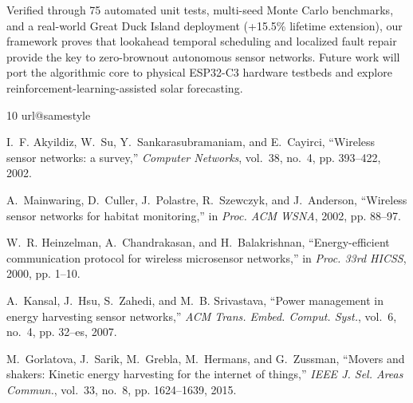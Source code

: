 \documentclass[journal]{IEEEtran}
\begin{document}
Verified through 75 automated unit tests, multi-seed Monte Carlo benchmarks, and a real-world Great Duck Island deployment (+15.5\% lifetime extension), our framework proves that lookahead temporal scheduling and localized fault repair provide the key to zero-brownout autonomous sensor networks. Future work will port the algorithmic core to physical ESP32-C3 hardware testbeds and explore reinforcement-learning-assisted solar forecasting.


\begin{thebibliography}{10}
\providecommand{\url}[1]{#1}
\csname url@samestyle\endcsname
\providecommand{\newblock}{\relax}
\providecommand{\bibinfo}[2]{#2}
\providecommand{\BIBentrySTDinterwordspacing}{\spaceskip=0pt\relax}
\providecommand{\BIBentryALTinterwordstretchfactor}{4}
\providecommand{\BIBentryALTinterwordspacing}{\spaceskip=\fontdimen2\font plus
\BIBentryALTinterwordstretchfactor\fontdimen3\font minus
  \fontdimen4\font\relax}
\providecommand{\BIBforeignlanguage}[2]{{%
\expandafter\ifx\csname l@#1\endcsname\relax
\typeout{** WARNING: IEEEtran.bst: No hyphenation pattern has been}%
\typeout{** loaded for the language `#1'. Using the pattern for}%
\typeout{** the default language instead.}%
\else
\language=\csname l@#1\endcsname
\fi
#2}}
\providecommand{\BIBdecl}{\relax}
\BIBdecl

I.~F. Akyildiz, W.~Su, Y.~Sankarasubramaniam, and E.~Cayirci, ``Wireless sensor networks: a survey,'' \emph{Computer Networks}, vol.~38, no.~4, pp. 393--422, 2002.

A.~Mainwaring, D.~Culler, J.~Polastre, R.~Szewczyk, and J.~Anderson, ``Wireless sensor networks for habitat monitoring,'' in \emph{Proc. ACM WSNA}, 2002, pp. 88--97.

W.~R. Heinzelman, A.~Chandrakasan, and H.~Balakrishnan, ``Energy-efficient communication protocol for wireless microsensor networks,'' in \emph{Proc. 33rd HICSS}, 2000, pp. 1--10.

A.~Kansal, J.~Hsu, S.~Zahedi, and M.~B. Srivastava, ``Power management in energy harvesting sensor networks,'' \emph{ACM Trans. Embed. Comput. Syst.}, vol.~6, no.~4, pp. 32--es, 2007.

M.~Gorlatova, J.~Sarik, M.~Grebla, M.~Hermans, and G.~Zussman, ``Movers and shakers: Kinetic energy harvesting for the internet of things,'' \emph{IEEE J. Sel. Areas Commun.}, vol.~33, no.~8, pp. 1624--1639, 2015.


\end{thebibliography}
\end{document}
